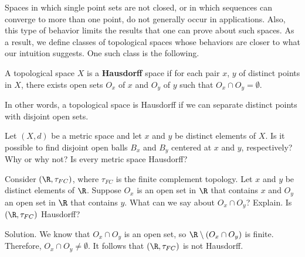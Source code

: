 \begin{pa}
Spaces in which single point sets are not closed, or in which sequences can converge to more than one point, do not generally occur in applications. Also, this type of behavior limits the results that one can prove about such spaces. As a result, we define classes of topological spaces whose behaviors are closer to what our intuition suggests. One such class is the following.

\begin{definition} A topological space $X$ is a \textbf{Hausdorff} space if for each pair $x$, $y$ of distinct points in $X$, there exists open sets $O_x$ of $x$ and $O_y$ of $y$ such that $O_x \cap O_y = \emptyset$. 
\end{definition}
In other words, a topological space is Hausdorff if we can separate distinct points with disjoint open sets.

\item 
	\ba
	\item Let $(X, d)$ be a metric space and let $x$ and $y$ be distinct elements of $X$. Is it possible to find disjoint open balls $B_x$ and $B_y$ centered at $x$ and $y$, respectively? Why or why not? Is every metric space Hausdorff?
	
	
	\item Consider $(\R, \tau_{FC})$, where $\tau_{FC}$ is the finite complement topology. Let $x$ and $y$ be distinct elements of $\R$. Suppose $O_x$ is an open set in $\R$ that contains $x$ and $O_y$ an open set in $\R$ that contains $y$. What can we say about $O_x \cap O_y$? Explain. Is $(\R, \tau_{FC})$ Hausdorff?
	
Solution. We know that $O_x \cap O_y$ is an open set, so $\R \setminus (O_x \cap O_y)$ is finite. Therefore, $O_x \cap O_y \neq \emptyset$. It follows that $(\R, \tau_{FC})$ is not Hausdorff.
		\ea
\ee

\end{pa}



